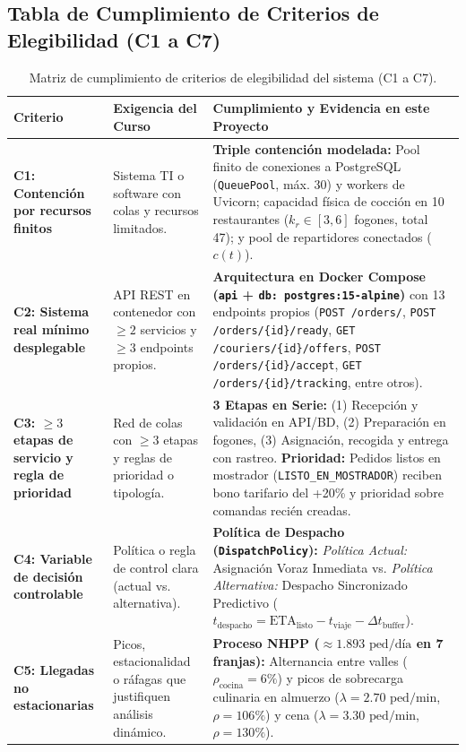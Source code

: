 \documentclass[11pt,letterpaper]{article}
\begin{document}
\subsection{Tabla de Cumplimiento de Criterios de Elegibilidad (C1 a C7)}

\begin{table}[htbp]
\centering
\small
\caption{Matriz de cumplimiento de criterios de elegibilidad del sistema (C1 a C7).}
\begin{tabularx}{\textwidth}{p{3.2cm} p{3.8cm} X}
\toprule
\textbf{Criterio} & \textbf{Exigencia del Curso} & \textbf{Cumplimiento y Evidencia en este Proyecto} \\
\midrule
\textbf{C1: Contención por recursos finitos} & Sistema TI o software con colas y recursos limitados. & \textbf{Triple contención modelada:} Pool finito de conexiones a PostgreSQL (\texttt{QueuePool}, máx. 30) y workers de Uvicorn; capacidad física de cocción en 10 restaurantes ($k_r \in [3, 6]$ fogones, total 47); y pool de repartidores conectados ($c(t)$). \\
\addlinespace
\textbf{C2: Sistema real mínimo desplegable} & API REST en contenedor con $\ge 2$ servicios y $\ge 3$ endpoints propios. & \textbf{Arquitectura en Docker Compose (\texttt{api} + \texttt{db: postgres:15-alpine})} con 13 endpoints propios (\texttt{POST /orders/}, \texttt{POST /orders/\{id\}/ready}, \texttt{GET /couriers/\{id\}/offers}, \texttt{POST /orders/\{id\}/accept}, \texttt{GET /orders/\{id\}/tracking}, entre otros). \\
\addlinespace
\textbf{C3: $\ge 3$ etapas de servicio y regla de prioridad} & Red de colas con $\ge 3$ etapas y reglas de prioridad o tipología. & \textbf{3 Etapas en Serie:} (1) Recepción y validación en API/BD, (2) Preparación en fogones, (3) Asignación, recogida y entrega con rastreo. \textbf{Prioridad:} Pedidos listos en mostrador (\texttt{LISTO\_EN\_MOSTRADOR}) reciben bono tarifario del +20\% y prioridad sobre comandas recién creadas. \\
\addlinespace
\textbf{C4: Variable de decisión controlable} & Política o regla de control clara (actual vs. alternativa). & \textbf{Política de Despacho (\texttt{DispatchPolicy}):} \textit{Política Actual:} Asignación Voraz Inmediata vs. \textit{Política Alternativa:} Despacho Sincronizado Predictivo ($t_{\text{despacho}} = \text{ETA}_{\text{listo}} - t_{\text{viaje}} - \Delta t_{\text{buffer}}$). \\
\addlinespace
\textbf{C5: Llegadas no estacionarias} & Picos, estacionalidad o ráfagas que justifiquen análisis dinámico. & \textbf{Proceso NHPP ($\approx 1.893\text{ ped/día}$ en 7 franjas):} Alternancia entre valles ($\rho_{\text{cocina}} = 6\%$) y picos de sobrecarga culinaria en almuerzo ($\lambda = 2.70\text{ ped/min}$, $\rho = 106\%$) y cena ($\lambda = 3.30\text{ ped/min}$, $\rho = 130\%$). \\

\end{tabularx}
\end{table}
\end{document}
